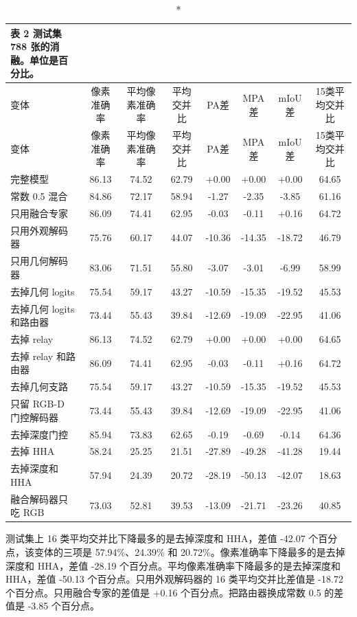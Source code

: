 \documentclass[11pt]{article}
\begin{document}
{\footnotesize\setlength{\tabcolsep}{3pt}
\begin{longtable}{lccccccc}
\caption*{表 2  测试集 788 张的消融。单位是百分比。}\\
\toprule
变体 & 像素准确率 & 平均像素准确率 & 平均交并比 & PA差 & MPA差 & mIoU差 & 15类平均交并比\\
\midrule
\endfirsthead
\toprule
变体 & 像素准确率 & 平均像素准确率 & 平均交并比 & PA差 & MPA差 & mIoU差 & 15类平均交并比\\
\midrule
\endhead
完整模型 & 86.13 & 74.52 & 62.79 & +0.00 & +0.00 & +0.00 & 64.65\\
常数 0.5 混合 & 84.86 & 72.17 & 58.94 & -1.27 & -2.35 & -3.85 & 61.16\\
只用融合专家 & 86.09 & 74.41 & 62.95 & -0.03 & -0.11 & +0.16 & 64.72\\
只用外观解码器 & 75.76 & 60.17 & 44.07 & -10.36 & -14.35 & -18.72 & 46.79\\
只用几何解码器 & 83.06 & 71.51 & 55.80 & -3.07 & -3.01 & -6.99 & 58.99\\
去掉几何 logits & 75.54 & 59.17 & 43.27 & -10.59 & -15.35 & -19.52 & 45.53\\
去掉几何 logits 和路由器 & 73.44 & 55.43 & 39.84 & -12.69 & -19.09 & -22.95 & 41.06\\
去掉 relay & 86.13 & 74.52 & 62.79 & +0.00 & +0.00 & +0.00 & 64.65\\
去掉 relay 和路由器 & 86.09 & 74.41 & 62.95 & -0.03 & -0.11 & +0.16 & 64.72\\
去掉几何支路 & 75.54 & 59.17 & 43.27 & -10.59 & -15.35 & -19.52 & 45.53\\
只留 RGB-D 门控解码器 & 73.44 & 55.43 & 39.84 & -12.69 & -19.09 & -22.95 & 41.06\\
去掉深度门控 & 85.94 & 73.83 & 62.65 & -0.19 & -0.69 & -0.14 & 64.36\\
去掉 HHA & 58.24 & 25.25 & 21.51 & -27.89 & -49.28 & -41.28 & 19.44\\
去掉深度和 HHA & 57.94 & 24.39 & 20.72 & -28.19 & -50.13 & -42.07 & 18.63\\
融合解码器只吃 RGB & 73.03 & 52.81 & 39.53 & -13.09 & -21.71 & -23.26 & 40.85\\
\bottomrule
\end{longtable}
}
测试集上 16 类平均交并比下降最多的是去掉深度和 HHA，差值 -42.07 个百分点，该变体的三项是 57.94\%、24.39\% 和 20.72\%。像素准确率下降最多的是去掉深度和 HHA，差值 -28.19 个百分点。平均像素准确率下降最多的是去掉深度和 HHA，差值 -50.13 个百分点。只用外观解码器的 16 类平均交并比差值是 -18.72 个百分点。只用融合专家的差值是 +0.16 个百分点。把路由器换成常数 0.5 的差值是 -3.85 个百分点。
\end{document}
